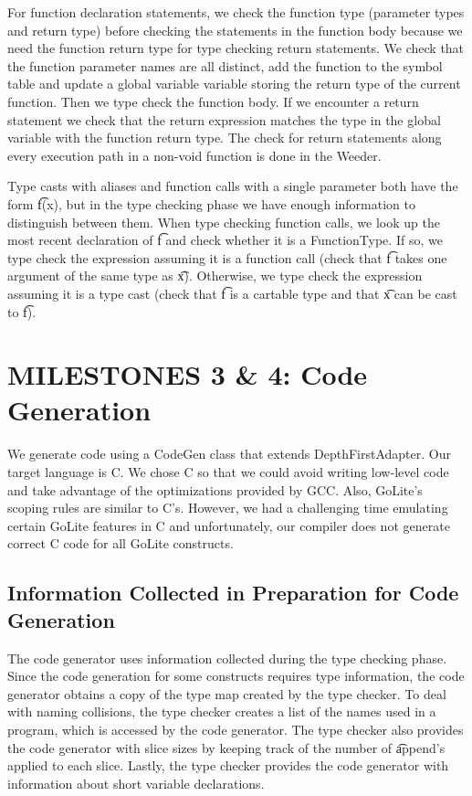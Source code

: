 \documentclass[11pt]{article}
\begin{document}
For function declaration statements, we check the function type (parameter types and return type) before checking the statements in the function body because we need the function return type for type checking return statements. We check that the function parameter names are all distinct, add the function to the symbol table and update a global variable variable storing the return type of the current function. Then we type check the function body. If we encounter a return statement we check that the return expression matches the type in the global variable with the function return type. The check for return statements along every execution path in a non-void function is done in the Weeder. 

Type casts with aliases and function calls with a single parameter both have the form \t{f(x)}, but in the type checking phase we have enough information to distinguish between them. When type checking function calls, we look up the most recent declaration of \t{f} and check whether it is a FunctionType. If so, we type check the expression assuming it is a function call (check that \t{f} takes one argument of the same type as \t{x}). Otherwise, we type check the expression assuming it is a type cast (check that \t{f} is a cartable type and that \t{x} can be cast to \t{f}).



\section{MILESTONES 3 \& 4: Code Generation}

We generate code using a CodeGen class that extends DepthFirstAdapter. Our target language is C. We chose C so that we could avoid writing low-level code and take advantage of the optimizations provided by GCC. Also, GoLite's scoping rules are similar to C's. However, we had a challenging time emulating certain GoLite features in C and unfortunately, our compiler does not generate correct C code for all GoLite constructs.


\subsection{Information Collected in Preparation for Code Generation}
The code generator uses information collected during the type checking phase. Since the code generation for some constructs requires type information, the code generator obtains a copy of the type map created by the type checker. To deal with naming collisions, the type checker creates a list of the names used in a program, which is accessed by the code generator. The type checker also provides the code generator with slice sizes by keeping track of the number of \t{append}'s applied to each slice. Lastly, the type checker provides the code generator with information about short variable declarations. 
\end{document}

